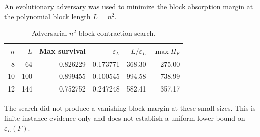An evolutionary adversary was used to minimize the block absorption margin at
the polynomial block length $L=n^2$.

\begin{table}[t]
\centering
\caption{Adversarial $n^2$-block contraction search.}
\begin{tabular}{rrrrrr}
\toprule
$n$ & $L$ & Max survival & $\varepsilon_L$ & $L/\varepsilon_L$ &
$\max H_F$ \\
\midrule
8 & 64 & 0.826229 & 0.173771 & 368.30 & 275.00 \\
10 & 100 & 0.899455 & 0.100545 & 994.58 & 738.99 \\
12 & 144 & 0.752752 & 0.247248 & 582.41 & 357.17 \\
\bottomrule
\end{tabular}
\end{table}

The search did not produce a vanishing block margin at these small sizes.  This
is finite-instance evidence only and does not establish a uniform lower bound
on $\varepsilon_L(F)$.
